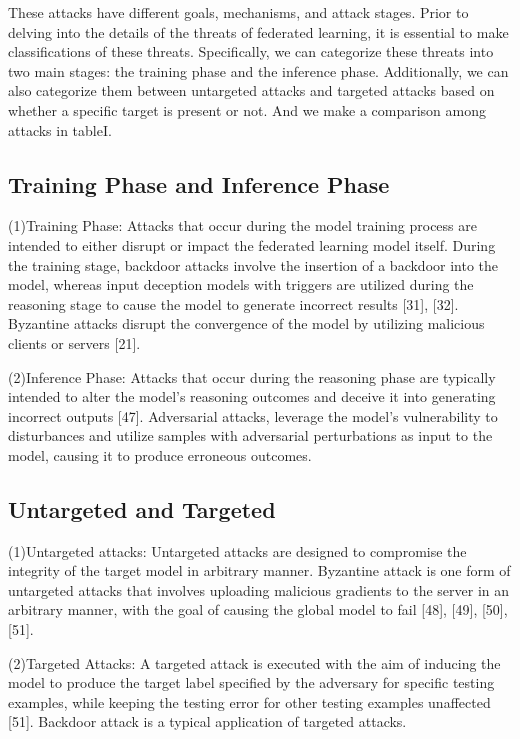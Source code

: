 These attacks have different goals, mechanisms, and
attack stages. Prior to delving into the details of the
threats of federated learning, it is essential to make classifications
of these threats. Specifically, we can categorize
these threats into two main stages: the training phase and
the inference phase. Additionally, we can also categorize
them between untargeted attacks and targeted attacks
based on whether a specific target is present or not. And
we make a comparison among attacks in tableI. 

\subsection{Training Phase and Inference Phase}
(1)Training Phase: Attacks that occur during the model
training process are intended to either disrupt or impact
the federated learning model itself. During the training
stage, backdoor attacks involve the insertion of a backdoor
into the model, whereas input deception models with
triggers are utilized during the reasoning stage to cause
the model to generate incorrect results [31], [32]. Byzantine
attacks disrupt the convergence of the model by utilizing
malicious clients or servers [21].  

(2)Inference Phase: Attacks that occur during the
reasoning phase are typically intended to alter the model's
reasoning outcomes and deceive it into generating incorrect
outputs [47]. Adversarial attacks, leverage the model's
vulnerability to disturbances and utilize samples with
adversarial perturbations as input to the model, causing
it to produce erroneous outcomes.  

\subsection{Untargeted and Targeted}
(1)Untargeted attacks: Untargeted attacks are designed
to compromise the integrity of the target model in 
arbitrary manner. Byzantine attack is one form of untargeted
attacks that involves uploading malicious gradients to the
server in an arbitrary manner, with the goal of causing
the global model to fail [48], [49], [50], [51].  

(2)Targeted Attacks: A targeted attack is executed with
the aim of inducing the model to produce the target label
specified by the adversary for specific testing examples,
while keeping the testing error for other testing examples
unaffected [51]. Backdoor attack is a typical application
of targeted attacks.  